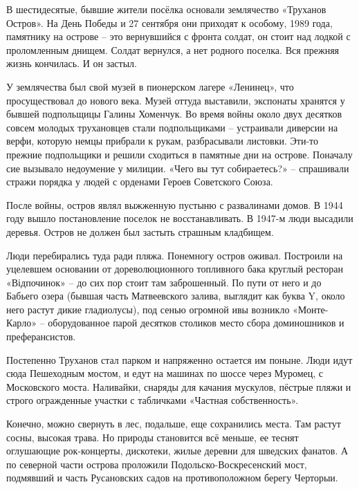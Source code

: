 В шестидесятые, бывшие жители посёлка основали землячество «Труханов Остров». На День Победы и 27 сентября они приходят к особому, 1989 года, памятнику на острове – это вернувшийся с фронта солдат, он стоит над лодкой с проломленным днищем. Солдат вернулся, а нет родного поселка. Вся прежняя жизнь кончилась. И он застыл.

У землячества был свой музей в пионерском лагере «Ленинец», что просуществовал до нового века. Музей оттуда выставили, экспонаты хранятся у бывшей подпольщицы Галины Хоменчук. Во время войны около двух десятков совсем молодых трухановцев стали подпольщиками – устраивали диверсии на верфи, которую немцы прибрали к рукам, разбрасывали листовки. Эти-то прежние подпольщики и решили сходиться в памятные дни на острове. Поначалу сие вызывало недоумение у милиции. «Чего вы тут собираетесь?» – спрашивали стражи порядка у людей с орденами Героев Советского Союза.%


После войны, остров являл выжженную пустыню с развалинами домов. В 1944 году вышло постановление поселок не восстанавливать. В 1947-м люди высадили деревья. Остров не должен был застыть страшным кладбищем. 

Люди перебирались туда ради пляжа. Понемногу остров оживал. Построили на уцелевшем основании от дореволюционного топливного бака круглый ресторан «Відпочинок» – до сих пор стоит там заброшенный. По пути от него и до Бабьего озера (бывшая часть Матвеевского залива, выглядит как буква Y, около него растут дикие гладиолусы), под сенью огромной ивы возникло «Монте-Карло» – оборудованное парой десятков столиков место сбора доминошников и преферансистов.

Постепенно Труханов стал парком и напряженно остается им поныне. Люди идут сюда Пешеходным мостом, и едут на машинах по шоссе через Муромец, с Московского моста. Наливайки, снаряды для качания мускулов, пёстрые пляжи и строго огражденные участки с табличками «Частная собственность».

Конечно, можно свернуть в лес, подальше, еще сохранились места. Там растут сосны, высокая трава. Но природы становится всё меньше, ее теснят оглушающие рок-концерты, дискотеки, жилые деревни для шведских фанатов. А по северной части острова проложили Подольско-Воскресенский мост, подмявший и часть Русановских садов на противоположном берегу Черторыи.

